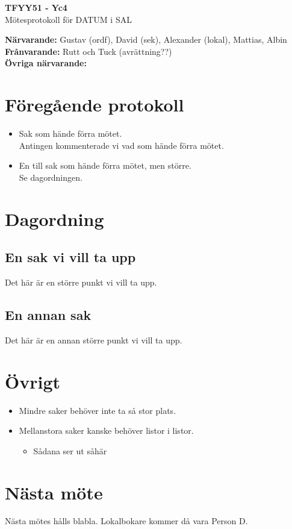 \documentclass[11pt,a4paper]{article}
\begin{document}
    \begin{center}
        \textbf{\Large TFYY51 - Yc4} \\[0.2em]
        Mötesprotokoll för DATUM i SAL
    \end{center}
    \vspace{1em}
    \textbf{Närvarande:} Gustav (ordf), David (sek), Alexander (lokal), Mattias, Albin \\[0.5em]
    \textbf{Frånvarande:} Rutt och Tuck (avrättning??) \\[0.5em]  %
    \textbf{Övriga närvarande:}

    \section*{Föregående protokoll}
    \begin{itemize}
        \item Sak som hände förra mötet. \\
        Antingen kommenterade vi vad som hände förra mötet.
        \item En till sak som hände förra mötet, men större. \\
        Se dagordningen.
    \end{itemize}

    \section*{Dagordning}
    \subsection*{En sak vi vill ta upp}
    Det här är en större punkt vi vill ta upp.
    \subsection*{En annan sak}
    Det här är en annan större punkt vi vill ta upp.

    \section*{Övrigt}
    \begin{itemize}
        \item Mindre saker behöver inte ta så stor plats.
        \item Mellanstora saker kanske behöver listor i listor.
        \begin{itemize}
            \item Sådana ser ut såhär
        \end{itemize}
    \end{itemize}

    \section*{Nästa möte}
    Nästa mötes hålls blabla. Lokalbokare kommer då vara Person D.  
\end{document}
